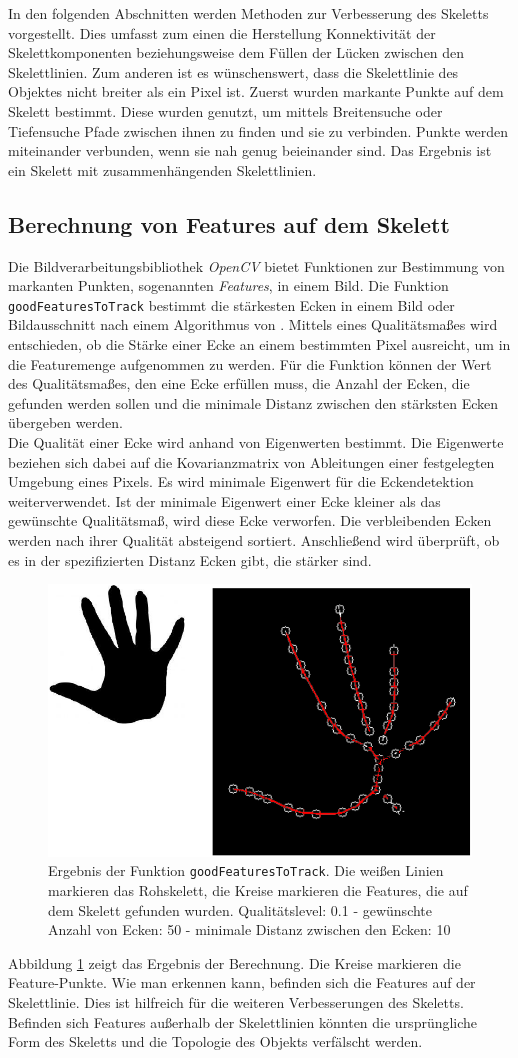In den folgenden Abschnitten werden Methoden zur Verbesserung des Skeletts vorgestellt. Dies umfasst zum einen die Herstellung Konnektivität der Skelettkomponenten beziehungsweise dem Füllen der Lücken zwischen den Skelettlinien. Zum anderen ist es wünschenswert, dass die Skelettlinie des Objektes nicht breiter als ein Pixel ist. Zuerst wurden markante Punkte auf dem Skelett bestimmt. Diese wurden
genutzt, um mittels Breitensuche oder Tiefensuche Pfade zwischen ihnen zu finden und sie zu verbinden. Punkte werden miteinander
verbunden, wenn sie nah genug beieinander sind. Das Ergebnis ist ein Skelett mit
zusammenhängenden Skelettlinien. 
\subsection{Berechnung von Features auf dem Skelett}
\label{subsec:features}
Die Bildverarbeitungsbibliothek \emph{OpenCV} bietet Funktionen zur Bestimmung von markanten Punkten, sogenannten \emph{Features},
in einem Bild. Die Funktion \texttt{goodFeaturesToTrack} bestimmt die stärkesten Ecken in einem Bild oder Bildausschnitt nach einem Algorithmus von \cite{goodfeatures}. Mittels eines Qualitätsmaßes wird entschieden, ob die Stärke einer
Ecke an einem bestimmten Pixel ausreicht, um in die Featuremenge aufgenommen zu werden. Für die
Funktion können der Wert des Qualitätsmaßes, den eine Ecke erfüllen muss, die Anzahl der Ecken, die gefunden werden sollen und die
minimale Distanz zwischen den stärksten Ecken übergeben werden.\\
Die Qualität einer Ecke wird anhand von Eigenwerten bestimmt. Die Eigenwerte beziehen sich dabei auf 
die Kovarianzmatrix von Ableitungen einer festgelegten Umgebung eines Pixels. Es wird minimale Eigenwert
für die Eckendetektion weiterverwendet. Ist der minimale Eigenwert einer Ecke kleiner als das gewünschte
Qualitätsmaß, wird diese Ecke verworfen. Die verbleibenden Ecken werden nach ihrer Qualität absteigend sortiert. Anschließend wird überprüft, ob es in der spezifizierten Distanz Ecken gibt, die stärker sind. 
\begin{figure}[htbp]
\centering
\includegraphics[width=0.4\linewidth]{./fig/features}
\caption{Ergebnis der Funktion \texttt{goodFeaturesToTrack}. Die weißen Linien markieren das Rohskelett, die Kreise markieren die Features, die auf dem Skelett gefunden wurden. Qualitätslevel: 0.1 - gewünschte Anzahl von Ecken: 50 - minimale Distanz zwischen den Ecken: 10}
\label{fig:features}
\end{figure}
Abbildung \ref{fig:features} zeigt das Ergebnis der Berechnung. Die Kreise markieren die Feature-Punkte. Wie man erkennen kann, befinden sich die Features auf der Skelettlinie. Dies ist hilfreich für die weiteren
Verbesserungen des Skeletts. Befinden sich Features außerhalb der Skelettlinien könnten die ursprüngliche Form des Skeletts und die Topologie des Objekts verfälscht werden.
